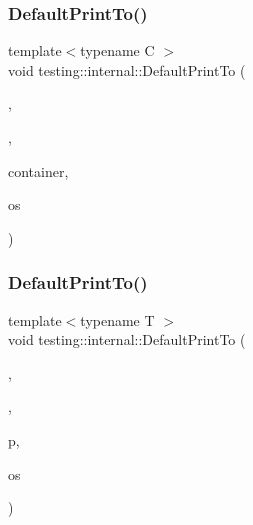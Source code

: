 \subsubsection{\texorpdfstring{Default\+Print\+To()}{DefaultPrintTo()}\hspace{0.1cm}{\footnotesize\ttfamily [1/3]}}
{\footnotesize\ttfamily template$<$typename C $>$ \\
void testing\+::internal\+::\+Default\+Print\+To (\begin{DoxyParamCaption}\item[{\hyperlink{namespacetesting_1_1internal_ad8f0c2883245f1df2a53618a49f0deb3}{Is\+Container}}]{,  }\item[{\hyperlink{namespacetesting_1_1internal_abb1d0789f19bdde21affccbd1078b525}{false\+\_\+type}}]{,  }\item[{const C \&}]{container,  }\item[{\+::std\+::ostream $\ast$}]{os }\end{DoxyParamCaption})}

\mbox{\label{namespacetesting_1_1internal_affa1f94e3ba8db8b964553c2871bf339}} 
\subsubsection{\texorpdfstring{Default\+Print\+To()}{DefaultPrintTo()}\hspace{0.1cm}{\footnotesize\ttfamily [2/3]}}
{\footnotesize\ttfamily template$<$typename T $>$ \\
void testing\+::internal\+::\+Default\+Print\+To (\begin{DoxyParamCaption}\item[{\hyperlink{namespacetesting_1_1internal_abf080521ce135deb510e0a7830fd3d33}{Is\+Not\+Container}}]{,  }\item[{\hyperlink{namespacetesting_1_1internal_a62f917c3424d8841de9b49b5ec28edb4}{true\+\_\+type}}]{,  }\item[{T $\ast$}]{p,  }\item[{\+::std\+::ostream $\ast$}]{os }\end{DoxyParamCaption})}

\mbox{\label{namespacetesting_1_1internal_a78e4937ba564f01dac2ff25f3eece0ec}} 
